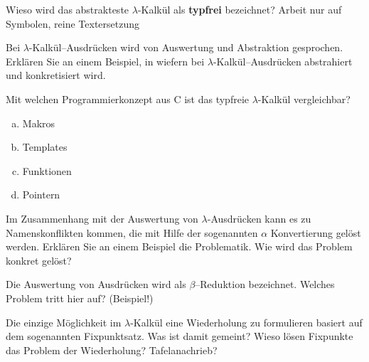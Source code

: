 \begin{card}
	Wieso wird das abstrakteste $\lambda$-Kalkül als \textbf{typfrei} bezeichnet?
	\hr
	Arbeit nur auf Symbolen, reine Textersetzung
\end{card}

\begin{card}
	Bei $\lambda$-Kalkül–Ausdrücken wird von Auswertung und Abstraktion gesprochen. Erklären Sie an einem Beispiel, in wiefern bei $\lambda$-Kalkül–Ausdrücken abstrahiert und	konkretisiert wird.
	\hr
	
\end{card}

\begin{card}
	Mit welchen Programmierkonzept aus C ist das typfreie $\lambda$-Kalkül vergleichbar? 
	\begin{enumerate}[a)]
	\item Makros
	\item Templates
	\item Funktionen
	\item Pointern
	\end{enumerate}
	\hr
\end{card}

\begin{card}
	Im Zusammenhang mit der Auswertung von $\lambda$-Ausdrücken kann es zu Namenskonflikten	kommen, die mit Hilfe der sogenannten
	$\alpha$
	Konvertierung gelöst werden. Erklären Sie an einem Beispiel die Problematik. Wie wird das Problem konkret gelöst?
	\hr
\end{card}

\begin{card}
	Die Auswertung von Ausdrücken wird als $\beta$–Reduktion bezeichnet. Welches Problem tritt hier auf? (Beispiel!)
	\hr
\end{card}

\begin{card}
	Die einzige Möglichkeit im $\lambda$-Kalkül eine Wiederholung zu formulieren basiert auf dem sogenannten Fixpunktsatz. Was ist damit gemeint? Wieso lösen Fixpunkte das Problem der Wiederholung? 
	\hr
	Tafelanachrieb?
\end{card}